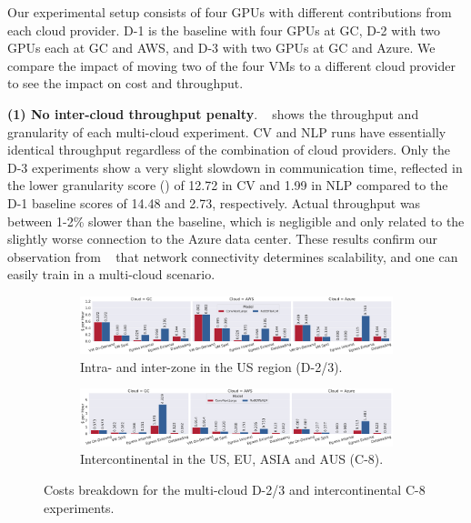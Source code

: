 Our experimental setup consists of four GPUs with different contributions from each cloud provider. D-1 is the baseline with four GPUs at GC, D-2 with two GPUs each at GC and AWS, and D-3 with two GPUs at GC and Azure.
We compare the impact of moving two of the four VMs to a different cloud provider to see the impact on cost and throughput.

\textbf{(1) No inter-cloud throughput penalty}. ~ shows the throughput and granularity of each multi-cloud experiment.
CV and NLP runs have essentially identical throughput regardless of the combination of cloud providers.
Only the D-3 experiments show a very slight slowdown in communication time, reflected in the lower granularity score () of 12.72 in CV and 1.99 in NLP compared to the D-1 baseline scores of 14.48 and 2.73, respectively.
Actual throughput was between 1-2\% slower than the baseline, which is negligible and only related to the slightly worse connection to the Azure data center.
These results confirm our observation from ~ that network connectivity determines scalability, and one can easily train in a multi-cloud scenario.
\vspace*{-2mm}

\begin{figure}[h]
    \begin{subfigure}[c]{0.48\textwidth}
        \includegraphics[width=\textwidth]{figures/misc/multi_cloud_cost_comparison_d3}
        \vspace{-15pt}
        \caption{Intra- and inter-zone in the US region (D-2/3).}
        \label{fig:multi-cloud-costs-d3}
    \end{subfigure}
    \begin{subfigure}[c]{0.48\textwidth}
        \includegraphics[width=\textwidth]{figures/misc/multi_cloud_cost_comparison_c8}  
        \vspace{-15pt}
        \caption{Intercontinental in the US, EU, ASIA and AUS (C-8).}
        \label{fig:multi-cloud-costs-c8}
    \end{subfigure} 
    \vspace{-10pt}
    \caption{Costs breakdown for the multi-cloud D-2/3 and intercontinental C-8 experiments.}  
    \label{fig:normalized-multi-cloud-costs}
    \vspace*{-5mm}
\end{figure}  
 
